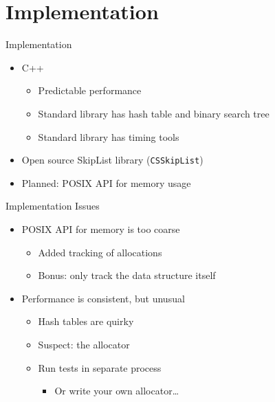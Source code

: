 \documentclass[10pt]{beamer}
\begin{document}
\section{Implementation}
\begin{frame}{Implementation}
    \begin{itemize}
        \item C++
        \begin{itemize}
            \item Predictable performance
            \item Standard library has hash table and binary search tree
            \item Standard library has timing tools
        \end{itemize}
        \item Open source SkipList library (\texttt{CSSkipList})
        \item Planned: POSIX API for memory usage
    \end{itemize}
\end{frame}

\begin{frame}{Implementation Issues}
    \begin{itemize}
        \item POSIX API for memory is too coarse
        \begin{itemize}
            \item Added tracking of allocations
            \item Bonus: only track the data structure itself
        \end{itemize}
        \item Performance is consistent, but unusual
        \begin{itemize}
            \item Hash tables are quirky
            \item Suspect: the allocator
            \item Run tests in separate process
            \begin{itemize}
                \item Or write your own allocator\ldots
            \end{itemize}
        \end{itemize}
    \end{itemize}
\end{frame}
\end{document}
